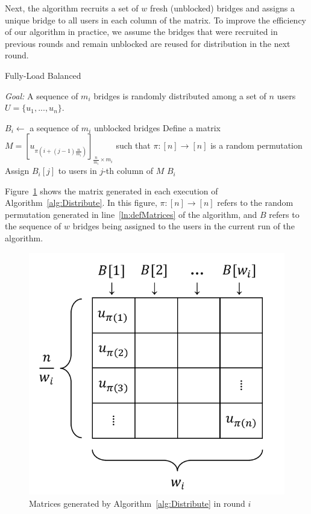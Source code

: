 Next, the algorithm recruits a set of $w$ fresh (unblocked) bridges and assigns a unique bridge to all users in each column of the matrix. To improve the efficiency of our algorithm in practice, we assume the bridges that were recruited in previous rounds and remain unblocked are reused for distribution in the next round.

\begin{algorithm}[t]
	\caption{Fully-Load Balanced }
	\label{alg:DistributeModified}
	
	\algFont \vspace{5pt}
	\textit{Goal:} A sequence of $m_i$ bridges is randomly distributed among a set of $n$ users ${U = \{u_1,...,u_n\}}$.\vspace{0.3em}
	\begin{algorithmic}[1]
		\State $B_i \gets$ a sequence of $m_i$ unblocked bridges \label{ln:recruitBridges}
		\State Define a matrix $M = \left[u_{\pi\left(i+(j-1)\frac{n}{m_i}\right)}\right]_{\frac{n}{m_i}\times m_i}$ such 
		\Statex \hspace{\algorithmicindent}that $\pi:[n]\to[n]$ is a random permutation \label{ln:defMatrices}
		\State Assign $B_i[j]$ to users in $j$-th column of $M$ \label{ln:assignColumns}
		\EndFor
		\State \Return $B_i$
		\EndFunction
	\end{algorithmic}
\end{algorithm}
Figure~\ref{fig:matrices} shows the matrix generated in each execution of Algorithm~\ref{alg:Distribute}. In this figure, ${\pi:[n]\to[n]}$ refers to the random permutation generated in line~\ref{ln:defMatrices} of the algorithm, and $B$ refers to the sequence of $w$ bridges being assigned to the users in the current run of the algorithm.

\begin{figure}[!t]
	\centering
	\includegraphics[width=0.7\linewidth]{images/matrices}
	\caption{Matrices generated by Algorithm~\ref{alg:Distribute} in round $i$}
	\label{fig:matrices}
\end{figure}

